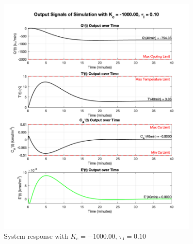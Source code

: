 \documentclass[12pt]{article}
\begin{document}
\begin{enumerate}
\begin{enumerate}
    \begin{figure}[H]
      \centering
      \includegraphics[width=0.900\textwidth]{Figures/figure2_5_testcase4.png}
      \caption{System response with $K_c = -1000.00$, $\tau_I = 0.10$}
      \label{fig:figure2_5_testcase4}
    \end{figure}    
        
  \end{enumerate}

\end{enumerate}
\end{document}
